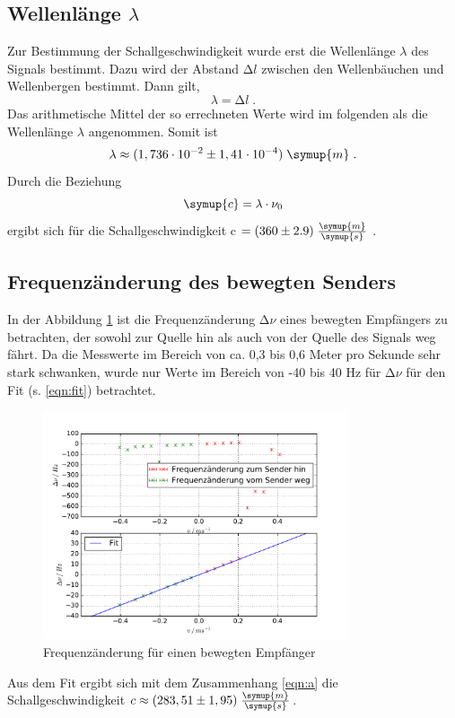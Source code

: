 \subsection{Wellenlänge \texorpdfstring{$\lambda$}{[math]}}
Zur Bestimmung der Schallgeschwindigkeit wurde erst die Wellenlänge $\lambda$ des Signals
bestimmt. Dazu wird der Abstand $\increment l$ zwischen den Wellenbäuchen und Wellenbergen
bestimmt. Dann gilt,
\begin{equation*}
  \lambda = \increment l \;.
\end{equation*}
Das arithmetische Mittel der so errechneten Werte wird im folgenden als die
Wellenlänge $\lambda$ angenommen. Somit ist
\begin{equation*}
  \lambda \approx (1,736\cdot 10^{-2} \pm 1,41\cdot10^{-4})\;\symup{m}\; .
\end{equation*}
Durch die Beziehung
\begin{equation*}
  \symup{c} = \lambda \cdot \nu_0
\end{equation*}
ergibt sich für die Schallgeschwindigkeit c $ = (360 \pm 2.9)\;
 \frac{\symup{m}}{\symup{s}}$ .
\subsection{Frequenzänderung des bewegten Senders}
In der Abbildung \ref{fig:d} ist die Frequenzänderung $\increment \nu$ eines
bewegten Empfängers zu betrachten, der sowohl zur Quelle hin als auch von der
Quelle des Signals weg fährt. Da die Messwerte im Bereich von ca. 0,3 bis 0,6
Meter pro Sekunde sehr stark schwanken, wurde nur Werte im Bereich von -40 bis
40 Hz für $\increment \nu $ für den Fit (s. \eqref{eqn:fit}) betrachtet.
\begin{figure}
  \centering
  \includegraphics[width=0.8\textwidth]{plots/dplot.pdf}
  \caption{Frequenzänderung für einen bewegten Empfänger}
  \label{fig:d}
\end{figure}
Aus dem Fit ergibt sich mit dem Zusammenhang \eqref{eqn:a} die
Schallgeschwindigkeit $c \approx (283,51 \pm 1,95)\; \frac{\symup{m}}{\symup{s}}$.


